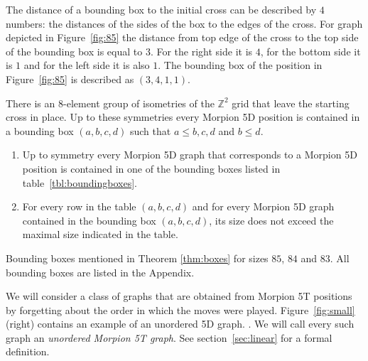 \begin{notation}
The distance of a bounding box to the initial cross can be described by $4$ numbers: the distances of the sides of the box to the edges of the cross. 
For graph depicted in Figure~\ref{fig:85} the distance from top edge of the cross to the top side of the bounding box is equal to $3$. For the right side it is $4$, for the bottom side it is $1$ and for the left side it is also $1$. 
The bounding box of the position in Figure~\ref{fig:85} is described as $(3,4,1,1)$.
\end{notation}
  
There is an $8$-element group of isometries of the $\mathbb{Z}^2$ grid that leave the starting cross in place.
Up to these symmetries every Morpion 5D position is contained in a bounding box $(a,b,c,d)$ such that
  $a \leq b,c,d$ and $b \leq d$. 
\begin{theorem}
\begin{enumerate}
\item Up to symmetry every Morpion 5D graph that corresponds to a Morpion 5D position
    is contained in one of the bounding boxes listed in table~\ref{tbl:boundingboxes}.
\item For every row in the table $(a,b,c,d)$ and for every Morpion 5D graph contained in the bounding box  $(a,b,c,d)$,
its size does not exceed the maximal size indicated in the table.
\end{enumerate} 
\label{thm:boxes}
\end{theorem}

\begin{table}[ht]
\centering
 

\caption{Bounding boxes mentioned in Theorem \ref{thm:boxes} for sizes $85$, $84$ and $83$. All bounding boxes are listed in the Appendix. }
\label{tbl:boundingboxes}
\end{table}

We will consider a class of graphs that are obtained from Morpion 5T positions by forgetting about 
  the order in which the moves were played. 
Figure~\ref{fig:small} (right) contains an example of an unordered 5D graph. .
We will call every such graph an \emph{unordered Morpion 5T graph}. See section~\ref{sec:linear} for a formal definition.


